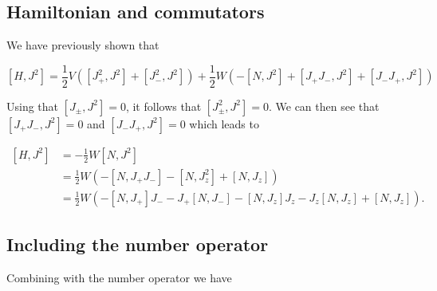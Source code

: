 \documentclass[11pt]{article}
\begin{document}
    \hypertarget{hamiltonian-and-commutators}{%
\subsection{Hamiltonian and
commutators}\label{hamiltonian-and-commutators}}

We have previously shown that

    \[
[H,J^2] = \frac{1}{2} V \left( [J_+^2,J^2] + [J_-^2,J^2] \right) +
\frac{1}{2} W \left( -[N,J^2] + [J_+ J_-,J^2] + [J_- J_+, J^2] \right)
\]

    Using that \([J_\pm,J^2] = 0\), it follows that \([J_\pm^2,J^2] = 0\).
We can then see that \([J_+ J_-,J^2] = 0\) and \([J_- J_+, J^2] = 0\)
which leads to

    \[
\begin{align*}
[H,J^2] &= -\frac{1}{2} W [N,J^2] \\
&= \frac{1}{2} W \left( -[N,J_+ J_-] - [N,J_z^2] + [N,J_z] \right) \\
&= \frac{1}{2} W \left( -[N,J_+]J_- - J_+[N,J_-] - [N,J_z]J_z - J_z[N,J_z] + [N,J_z] \right).
\end{align*}
\]

    \hypertarget{including-the-number-operator}{%
\subsection{Including the number
operator}\label{including-the-number-operator}}

Combining with the number operator we have
\end{document}
